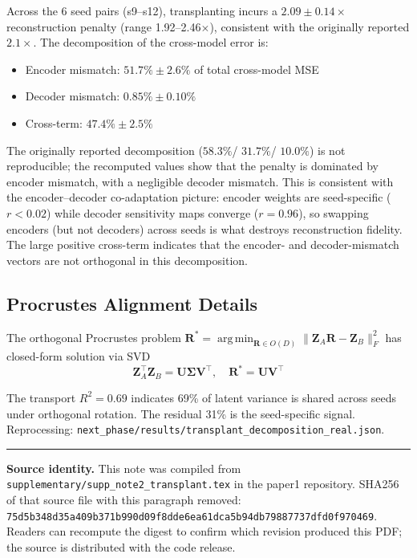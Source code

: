 \documentclass[11pt,a4paper]{article}
\newcommand{\Zmat}{\mathbf{Z}}
\DeclareMathOperator*{\argmin}{arg\,min}
\begin{document}
Across the 6 seed pairs (s9--s12), transplanting incurs a $2.09 \pm 0.14\times$ reconstruction penalty (range 1.92--2.46$\times$), consistent with the originally reported $2.1\times$. The decomposition of the cross-model error is:
\begin{itemize}
\item Encoder mismatch: $51.7\% \pm 2.6\%$ of total cross-model MSE
\item Decoder mismatch: $0.85\% \pm 0.10\%$
\item Cross-term: $47.4\% \pm 2.5\%$
\end{itemize}

The originally reported decomposition ($58.3\%$/ $31.7\%$/ $10.0\%$) is not reproducible; the recomputed values show that the penalty is dominated by encoder mismatch, with a negligible decoder mismatch. This is consistent with the encoder--decoder co-adaptation picture: encoder weights are seed-specific ($r<0.02$) while decoder sensitivity maps converge ($r=0.96$), so swapping encoders (but not decoders) across seeds is what destroys reconstruction fidelity. The large positive cross-term indicates that the encoder- and decoder-mismatch vectors are not orthogonal in this decomposition.

\subsection*{Procrustes Alignment Details}

The orthogonal Procrustes problem $\mathbf{R}^* = \argmin_{\mathbf{R}\in O(D)} \|\Zmat_A\mathbf{R} - \Zmat_B\|_F^2$ has closed-form solution via SVD \begin{equation}
\Zmat_A^\top\Zmat_B = \mathbf{U}\boldsymbol{\Sigma}\mathbf{V}^\top, \quad \mathbf{R}^* = \mathbf{U}\mathbf{V}^\top
\end{equation}

The transport $R^2 = 0.69$ indicates 69\% of latent variance is shared across seeds under orthogonal rotation. The residual 31\% is the seed-specific signal. Reprocessing: \texttt{next\_phase/results/transplant\_decomposition\_real.json}.

\vspace{10pt}
\noindent\rule{\textwidth}{0.4pt}
\footnotesize\textbf{Source identity.} This note was compiled from \texttt{supplementary/supp\_note2\_transplant.tex} in the paper1 repository. SHA256 of that source file with this paragraph removed: \texttt{75d5b348d35a409b371b990d09f8dde6ea61dca5b94db79887737dfd0f970469}. Readers can recompute the digest to confirm which revision produced this PDF; the source is distributed with the code release.
\end{document}
